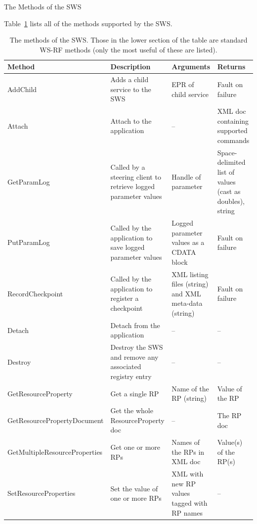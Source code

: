 \documentclass[a4paper]{article}
\begin{document}

\begin{section}{The Methods of the SWS}
\label{sec:swsMethods}

Table~\ref{table:SWSmethods} lists all of the methods supported by the
SWS.

\begin{table}
\begin{center}
\begin{tabular}{l|p{4cm}|p{4cm}|p{3cm}}
\hline\hline
Method & Description & Arguments & Returns\\
\hline
AddChild & Adds a child service to the SWS 
& EPR of child service  
& Fault on failure \\

Attach & Attach to the application & -- 
& XML doc containing supported commands\\

GetParamLog & Called by a steering client to retrieve logged parameter values 
& Handle of parameter 
& Space-delimited list of values (cast as doubles), string \\

PutParamLog & Called by the application to save logged parameter values 
& Logged parameter values as a CDATA block
& Fault on failure \\

RecordCheckpoint & Called by the application to register a checkpoint 
& XML listing files (string) and XML meta-data (string)
& Fault on failure \\

Detach & Detach from the application & -- & --\\
\hline
Destroy & Destroy the SWS and remove any associated registry entry & -- &--\\
GetResourceProperty & Get a single RP & Name of the RP (string) 
& Value of the RP \\

GetResourcePropertyDocument & Get the whole ResourceProperty doc 
& -- & The RP doc\\

GetMultipleResourceProperties & Get one or more RPs 
& Names of the RPs in XML doc & Value(s) of the RP(s) \\
SetResourceProperties & Set the value of one or more RPs 
& XML with new RP values tagged with RP names & -- \\
\hline\hline
\end{tabular}
\end{center}
\caption{The methods of the SWS.  Those in the lower section of the table 
are standard WS-RF methods (only the most useful of these are listed).}
\label{table:SWSmethods}
\end{table}

\end{section}
\end{document}
